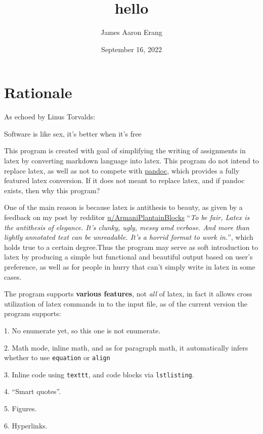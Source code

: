 \documentclass[12pt, UTF8]{article}
\title{hello}
\author{James Aaron Erang}
\date{September 16, 2022}
\begin{document}
	\maketitle
	
	\section*{Rationale}
	
	As echoed by Linus Torvalds:
	
	\begin{displayquote}
		Software is like sex, it's better when it's free
	\end{displayquote}
	
	This program is created with goal of simplifying the writing of assignments in latex by converting markdown language into latex. This program do not intend to replace latex, as well as not to compete with \href{https://pandoc.org/}{pandoc}, which provides a fully featured latex conversion. If it does not meant to replace latex, and if pandoc exists, then why this program?
	
	One of the main reason is because latex is antithesis to beauty, as given by a feedback on my post by redditor \href{https://www.reddit.com/user/ArmaniPlantainBlocks/}{u/ArmaniPlantainBlocks} ``\emph{To be fair, Latex is the antithesis of elegance. It's clunky, ugly, messy amd verbose. And more than lightly annotated text can be unreadable. It's a horrid format to work in.}'', which holds true to a certain degree.Thus the program may serve as soft introduction to latex by producing a simple but functional and beautiful output based on user's preference, as well as for people in hurry that can't simply write in latex in some cases.
	
	The program supports \textbf{various features}, not \textit{all} of latex, in fact it allows cross utilization of latex commands in to the input file, as of the current version the program supports:
	
	1. No enumerate yet, so this one is not enumerate.
	
	2. Math mode, inline math, and as for paragraph math, it automatically infers whether to use \texttt{equation} or \texttt{align}
	
	3. Inline code using \texttt{texttt{}}, and code blocks via \texttt{lstlisting}.
	
	4. ``Smart quotes''.
	
	5. Figures.
	
	6. Hyperlinks.
	
\end{document}
